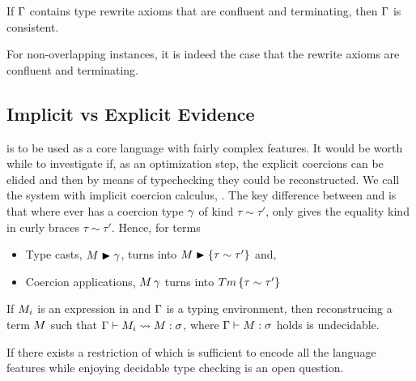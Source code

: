 \documentclass[manuscript,screen,nonacm]{acmart}
\begin{document}
\begin{theorem}
If $\Gamma$ contains type rewrite axioms that are confluent and terminating, then $\Gamma$ is consistent.
\end{theorem}
For non-overlapping instances, it is indeed the case that the rewrite axioms are confluent and terminating.



\subsection{Implicit vs Explicit Evidence}
\SFC is to be used as a core language with fairly complex features. It would be worth while to investigate if, as an optimization step, the explicit coercions can be elided and then by means of typechecking they could be reconstructed. We call the system with implicit coercion calculus, \SFCi. The key difference between \SFC and \SFCi is that where ever \SFC has a coercion type $\gamma$ of kind $\tau\sim\tau'$, \SFCi only gives the equality kind in curly braces $\tau\sim\tau'$. Hence, for terms
\begin{itemize}
\item Type casts, $M\mathrel{\blacktriangleright}\gamma$, turns into $M\mathrel{\blacktriangleright}\{\tau \sim \tau'\}$ and,
\item Coercion applications, $M\,\gamma$ turns into $Tm\,\{\tau \sim \tau'\}$
\end{itemize}


\begin{theorem}
  If $M_i$ is an expression in \SFCi and $\Gamma$ is a typing environment, then reconstrucing a \SFC term $M$ such that $\Gamma \vdash M_i \rightsquigarrow M : \sigma$, where $\Gamma \vdash M : \sigma$ holds is undecidable.
\end{theorem}

If there exists a restriction of \SFCi which is sufficient to encode all the language features while enjoying decidable type checking is an open question.


\section{\SFR}\label{sec:sfr} %
\end{document}
